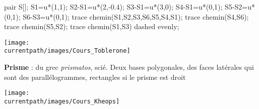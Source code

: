 \begin{changemargin}{-5mm}{-15mm}
\begin{Mind}
\begin{Bulle}[Nom=Prismes, Rayon=5,Largeur=0.55\linewidth,Ancre={-8,6},CTrace=blue]
            \begin{center}
                \hfill%
                \begin{Geometrie}
                    pair S[];
                    S1=u*(1,1);
                    S2-S1=u*(2,-0.4);
                    S3-S1=u*(3,0);
                    S4-S1=u*(0,1);
                    S5-S2=u*(0,1);
                    S6-S3=u*(0,1);
                    trace chemin(S1,S2,S3,S6,S5,S4,S1);
                    trace chemin(S4,S6);
                    trace chemin(S5,S2);
                    trace chemin(S1,S3) dashed evenly;
                \end{Geometrie}
                \hfill \texttt{[image: \\currentpath/images/Cours\_Toblerone]}\hfill\phantom{rrr}
            \end{center}

            \begin{minipage}{\linewidth}{\bf Prisme} : du grec {\it prismatos}, scié. Deux bases polygonales, des faces latérales qui sont des parallélogrammes, rectangles si le prisme est droit \end{minipage}
        \end{Bulle}
        \begin{Bulle}[Nom=Pyramides, Rayon=5,Largeur=0.3\linewidth,Ancre={1,6},CTrace=blue]
            \begin{center}
                \texttt{[image: \\currentpath/images/Cours\_Kheops]}

                \medskip
                \Solide[Nom=pyramide,SommetsPyramide=4,Sommets=false,DecalageSommet={(0,0,-1)}]
            \end{center}


\end{Bulle}
\end{Mind}
\end{changemargin}
